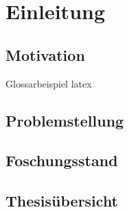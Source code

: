 %

\chapter{Einleitung}

\section{Motivation}
	Glossarbeispiel \gls{latex}
\section{Problemstellung}
\section{Foschungsstand}
\section{Thesisübersicht}

